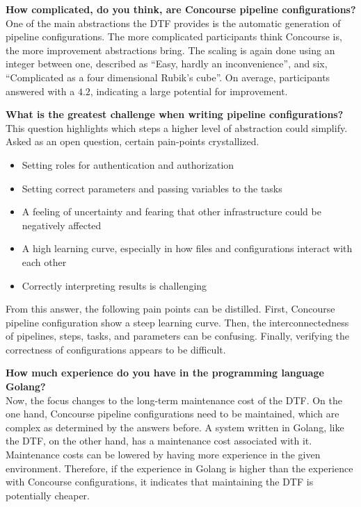 \textbf{How complicated, do you think, are Concourse pipeline configurations?}\\
One of the main abstractions the DTF provides is the automatic generation of pipeline configurations.
The more complicated participants think Concourse is, the more improvement abstractions bring.
The scaling is again done using an integer between one, described as ``Easy, hardly an inconvenience'', and six, ``Complicated as a four dimensional Rubik's cube''.
On average, participants answered with a $4.2$, indicating a large potential for improvement.

\textbf{What is the greatest challenge when writing pipeline configurations?}\\
This question highlights which steps a higher level of abstraction could simplify.
Asked as an open question, certain pain-points crystallized.

\begin{itemize}
    \item Setting roles for authentication and authorization
    \item Setting correct parameters and passing variables to the tasks
    \item A feeling of uncertainty and fearing that other infrastructure could be negatively affected
    \item A high learning curve, especially in how files and configurations interact with each other
    \item Correctly interpreting results is challenging
\end{itemize}

From this answer, the following pain points can be distilled.
First, Concourse pipeline configuration show a steep learning curve.
Then, the interconnectedness of pipelines, steps, tasks, and parameters can be confusing.
Finally, verifying the correctness of configurations appears to be difficult.

\textbf{How much experience do you have in the programming language Golang?}\\
Now, the focus changes to the long-term maintenance cost of the DTF.
On the one hand, Concourse pipeline configurations need to be maintained, which are complex as determined by the answers before.
A system written in Golang, like the DTF, on the other hand, has a maintenance cost associated with it.
Maintenance costs can be lowered by having more experience in the given environment.
Therefore, if the experience in Golang is higher than the experience with Concourse configurations, it indicates that maintaining the DTF is potentially cheaper.

